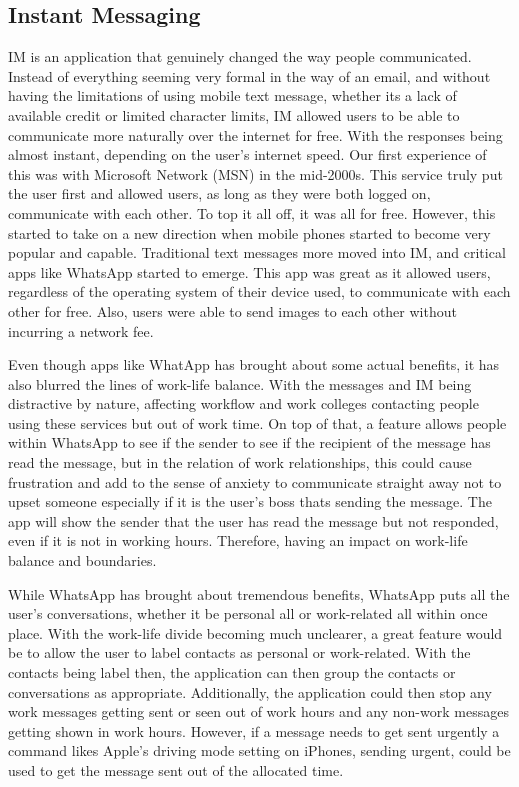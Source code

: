 \documentclass{sigchi}
\begin{document}
		\subsection{Instant Messaging}
		IM is an application that genuinely changed the way people communicated. Instead of everything seeming very formal in the way of an email, and without having the limitations of using mobile text message, whether its a lack of available credit or limited character limits, IM allowed users to be able to communicate more naturally over the internet for free. With the responses being almost instant, depending on the user's internet speed. Our first experience of this was with Microsoft Network (MSN) in the mid-2000s. This service truly put the user first and allowed users, as long as they were both logged on, communicate with each other. To top it all off, it was all for free. However, this started to take on a new direction when mobile phones started to become very popular and capable. Traditional text messages more moved into IM, and critical apps like WhatsApp started to emerge. This app was great as it allowed users, regardless of the operating system of their device used, to communicate with each other for free. Also, users were able to send images to each other without incurring a network fee.
		
		Even though apps like WhatApp has brought about some actual benefits, it has also blurred the lines of work-life balance. With the messages and IM being distractive by nature, affecting workflow and work colleges contacting people using these services but out of work time. On top of that, a feature allows people within WhatsApp to see if the sender to see if the recipient of the message has read the message, but in the relation of work relationships, this could cause frustration and add to the sense of anxiety to communicate straight away not to upset someone especially if it is the user's boss thats sending the message. The app will show the sender that the user has read the message but not responded, even if it is not in working hours. Therefore, having an impact on work-life balance and boundaries.
		
		While WhatsApp has brought about tremendous benefits, WhatsApp puts all the user's conversations, whether it be personal all or work-related all within once place. With the work-life divide becoming much unclearer, a great feature would be to allow the user to label contacts as personal or work-related. With the contacts being label then, the application can then group the contacts or conversations as appropriate.  Additionally, the application could then stop any work messages getting sent or seen out of work hours and any non-work messages getting shown in work hours. However, if a message needs to get sent urgently a command likes Apple's driving mode setting on iPhones, sending urgent, could be used to get the message sent out of the allocated time.
	
\end{document}
